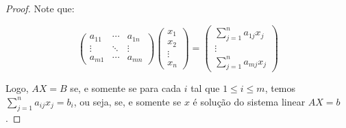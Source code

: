 \begin{proof}
    Note que:

    \begin{equation*}
        \begin{pmatrix}
            a_{11}& \cdots & a_{1n} \\
            \vdots & \ddots & \vdots \\
            a_{m1} & \cdots & a_{mn}
        \end{pmatrix}
        \begin{pmatrix}
            x_1 \\
            x_2 \\
            \vdots \\
            x_n
        \end{pmatrix}
        =
        \begin{pmatrix}
            \sum_{j=1}^n a_{1j} x_j \\
            \vdots \\
            \sum_{j=1}^n a_{mj} x_j
        \end{pmatrix}
    \end{equation*}

    Logo, $AX=B$ se, e somente se para cada $i$ tal que $1\leq i \leq m$, temos $\sum_{j=1}^n a_{ij} x_j = b_i$, ou seja, se, e somente se $x$ é solução do sistema linear $AX=b$.
\end{proof}